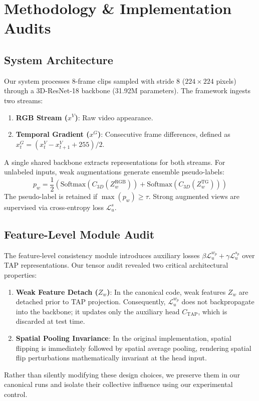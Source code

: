 \documentclass[10pt,twocolumn,letterpaper]{article}
\begin{document}
\section{Methodology \& Implementation Audits}
\label{sec:method}
\subsection{System Architecture}
Our system processes 8-frame clips sampled with stride 8 ($224 \times 224$ pixels) through a 3D-ResNet-18 backbone (31.92M parameters). The framework ingests two streams:
\begin{enumerate}
    \item \textbf{RGB Stream ($x^V$)}: Raw video appearance.
    \item \textbf{Temporal Gradient ($x^G$)}: Consecutive frame differences, defined as $x_t^G = (x_t^V - x_{t+1}^V + 255) / 2$.
\end{enumerate}
A single shared backbone extracts representations for both streams. For unlabeled inputs, weak augmentations generate ensemble pseudo-labels:
\begin{equation}
    p_w = \frac{1}{2} \left( \text{Softmax}(C_{3D}(Z_w^{\text{RGB}})) + \text{Softmax}(C_{3D}(Z_w^{\text{TG}})) \right)
\end{equation}
The pseudo-label is retained if $\max(p_w) \ge \tau$. Strong augmented views are supervised via cross-entropy loss $\mathcal{L}_u^s$.

\subsection{Feature-Level Module Audit}
The feature-level consistency module introduces auxiliary losses $\beta \mathcal{L}_u^{w_p} + \gamma \mathcal{L}_u^{s_p}$ over TAP representations. Our tensor audit revealed two critical architectural properties:
\begin{enumerate}
    \item \textbf{Weak Feature Detach ($Z_w$)}: In the canonical code, weak features $Z_w$ are detached prior to TAP projection. Consequently, $\mathcal{L}_u^{w_p}$ does not backpropagate into the backbone; it updates only the auxiliary head $C_{\text{TAP}}$, which is discarded at test time.
    \item \textbf{Spatial Pooling Invariance}: In the original implementation, spatial flipping is immediately followed by spatial average pooling, rendering spatial flip perturbations mathematically invariant at the head input.
\end{enumerate}
Rather than silently modifying these design choices, we preserve them in our canonical runs and isolate their collective influence using our experimental control.
\end{document}
